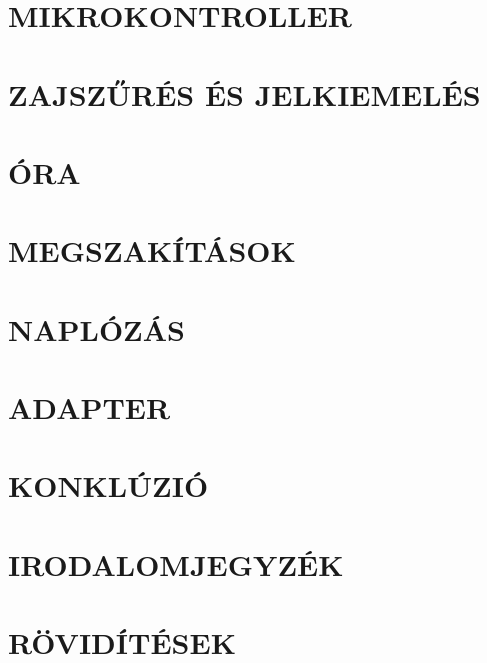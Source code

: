 \section{MIKROKONTROLLER}

\clearpage
\section{ZAJSZŰRÉS ÉS JELKIEMELÉS}

\clearpage
\section{ÓRA}

\clearpage
\section{MEGSZAKÍTÁSOK}

\clearpage
\section{NAPLÓZÁS}

\clearpage
\section{ADAPTER}

\clearpage
\section{KONKLÚZIÓ}


%












\clearpage
\section{IRODALOMJEGYZÉK}
\printbibliography[heading=none]

\clearpage
\renewcommand{\listfigurename}{ÁBRAJEGYZÉK}
\listoffigures

\clearpage
\renewcommand{\listtablename}{TÁBLAJEGYZÉK}
\listoftables

\clearpage
\section{RÖVIDÍTÉSEK}







